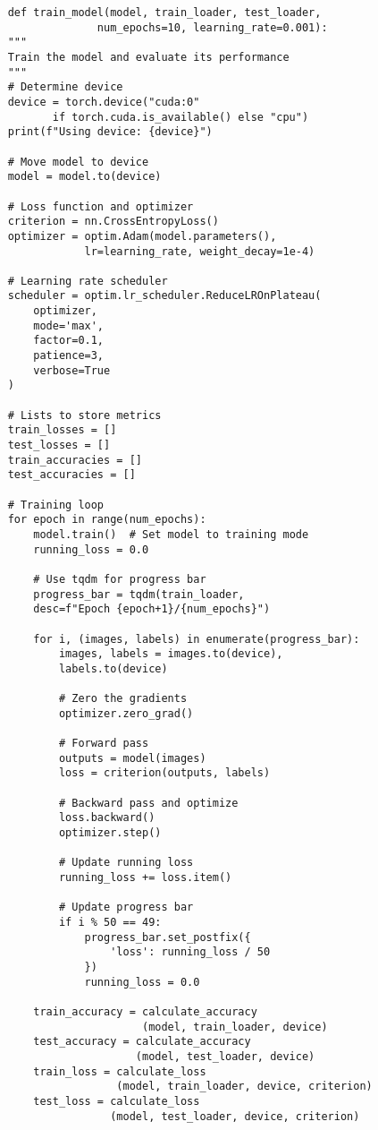\documentclass[../main.tex]{subfiles}
\begin{document}
\begin{verbatim}
    def train_model(model, train_loader, test_loader, 
                  num_epochs=10, learning_rate=0.001):
    """
    Train the model and evaluate its performance
    """
    # Determine device
    device = torch.device("cuda:0" 
           if torch.cuda.is_available() else "cpu")
    print(f"Using device: {device}")
    
    # Move model to device
    model = model.to(device)
    
    # Loss function and optimizer
    criterion = nn.CrossEntropyLoss()
    optimizer = optim.Adam(model.parameters(), 
                lr=learning_rate, weight_decay=1e-4)
    
    # Learning rate scheduler
    scheduler = optim.lr_scheduler.ReduceLROnPlateau(
        optimizer, 
        mode='max', 
        factor=0.1, 
        patience=3, 
        verbose=True
    )
    
    # Lists to store metrics
    train_losses = []
    test_losses = []
    train_accuracies = []
    test_accuracies = []
    
    # Training loop
    for epoch in range(num_epochs):
        model.train()  # Set model to training mode
        running_loss = 0.0
        
        # Use tqdm for progress bar
        progress_bar = tqdm(train_loader, 
        desc=f"Epoch {epoch+1}/{num_epochs}")
        
        for i, (images, labels) in enumerate(progress_bar):
            images, labels = images.to(device), 
            labels.to(device)
            
            # Zero the gradients
            optimizer.zero_grad()
            
            # Forward pass
            outputs = model(images)
            loss = criterion(outputs, labels)
            
            # Backward pass and optimize
            loss.backward()
            optimizer.step()
            
            # Update running loss
            running_loss += loss.item()
            
            # Update progress bar
            if i % 50 == 49:
                progress_bar.set_postfix({
                    'loss': running_loss / 50
                })
                running_loss = 0.0

        train_accuracy = calculate_accuracy
                         (model, train_loader, device)
        test_accuracy = calculate_accuracy
                        (model, test_loader, device)
        train_loss = calculate_loss
                     (model, train_loader, device, criterion)
        test_loss = calculate_loss
                    (model, test_loader, device, criterion)
        

\end{verbatim}
\end{document}

